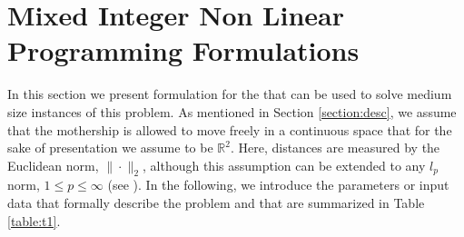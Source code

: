 \section{Mixed Integer Non Linear Programming Formulations}\label{Form}
\noindent
In this section\RE{,} we present  formulation for the \AMD \;\hspace{-2}  that can be used to solve medium size instances of this problem.
\noindent
As mentioned in Section \ref{section:desc}, we assume that the mothership is allowed to move freely in a continuous space that for the sake of presentation we  assume to be $\mathbb R^2$. Here,  distances are measured by the Euclidean norm, $\|\cdot\|_2$, although this assumption can be extended to any $l_p$ norm, $1\leq p\leq \infty$ (see \cite{Blanco2017}).
\noindent
In the following, we introduce the parameters or input data that formally describe the problem and that are summarized in Table \ref{table:t1}.

